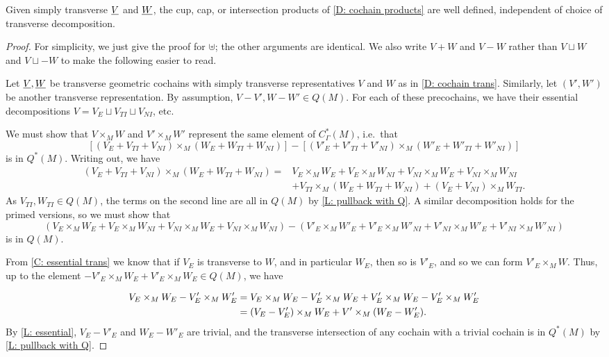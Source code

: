 \begin{theorem}\label{T: cochain product}
Given simply transverse $\underline{V}$ and $\underline{W}$, the cup, cap, or intersection products of \cref{D: cochain products} are well defined, independent of choice of transverse decomposition.
\end{theorem}
\begin{proof}
For simplicity, we just give the proof for $\uplus$; the other arguments are identical. We also write $V+W$ and $V-W$ rather than $V\sqcup W$ and $V\sqcup-W$ to make the following easier to read.

Let $\underline{V},\underline{W}$ be transverse geometric cochains with simply transverse representatives $V$ and $W$ as in \cref{D: cochain trans}. Similarly, let $(V',W')$ be another transverse representation.
By assumption, $V-V', W-W' \in Q(M)$. For each of these precochains, we have their essential decompositions $V = V_E\sqcup V_{TI}\sqcup V_{NI}$, etc.

We must show that $V \times_M W$ and $V' \times_M W'$ represent the same element of $C^*_\Gamma(M)$, i.e.\ that
$$[(V_E+V_{TI}+V_{NI}) \times_M (W_E+W_{TI}+W_{NI})] - [(V'_E+V'_{TI}+V'_{NI}) \times_M (W'_E+W'_{TI}+W'_{NI})]$$
is in $Q^*(M)$. Writing out, we have
\begin{align*}(V_E+V_{TI}+V_{NI}) \times_M (W_E+W_{TI}+W_{NI}) = &V_E \times_M W_E+V_E \times_M W_{NI}+V_{NI} \times_M W_E+V_{NI} \times_M W_{NI}\\
&+V_{TI} \times_M (W_E+W_{TI}+W_{NI})+(V_E+V_{NI}) \times_M W_{TI}.
\end{align*}
As $V_{TI},W_{TI} \in Q(M)$, the terms on the second line are all in $Q(M)$ by \cref{L: pullback with Q}.
A similar decomposition holds for the primed versions, so we must show that
\begin{equation}\label{E: intersect}
(V_E \times_M W_E+V_E \times_M W_{NI}+V_{NI} \times_M W_E+V_{NI} \times_M W_{NI})-(V'_E \times_M W'_E+V'_E \times_M W'_{NI}+V'_{NI} \times_M W'_E+V'_{NI} \times_M W'_{NI})
\end{equation}
is in $Q(M)$.

From \cref{C: essential trans} we know that if $V_E$ is transverse to $W$, and in particular $W_E$, then so is $V'_E$, and so we can form $V'_E \times_M W$.
 Thus, up to the element $-V'_E \times_M W_E+V'_E \times_M W_E \in Q(M)$, we have

\begin{align}
V_E \times_M W_E -V'_E \times_M W'_E& = V_E \times_M W_E-V'_E \times_M W_E+V'_E \times_M W_E-V'_E \times_M W'_E\notag\\
& = (V_E-V'_E) \times_M W_E+V' \times_M (W_E-W'_E).\label{E: transfer}
\end{align}
By \cref{L: essential}, $V_E-V'_E$ and $W_E-W'_E$ are trivial, and the transverse intersection of any cochain with a trivial cochain is in $Q^*(M)$ by
\cref{L: pullback with Q}.


\end{proof}
